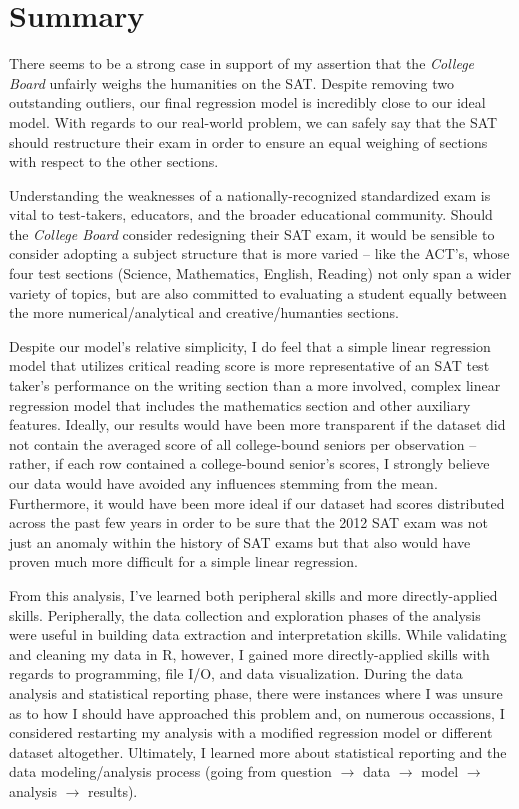 \documentclass[11pt]{article} %
\begin{document}
\section*{Summary}
There seems to be a strong case in support of my assertion that the \textit{College Board} unfairly weighs the humanities on the SAT. Despite removing two outstanding outliers, our final regression model is incredibly close to our ideal model. With regards to our real-world problem, we can safely say that the SAT should restructure their exam in order to ensure an equal weighing of sections with respect to the other sections. \par
Understanding the weaknesses of a nationally-recognized standardized exam is vital to test-takers, educators, and the broader educational community. Should the \textit{College Board} consider redesigning their SAT exam, it would be sensible to consider adopting a subject structure that is more varied -- like the ACT's, whose four test sections (Science, Mathematics, English, Reading) not only span a wider variety of topics, but are also committed to evaluating a student equally between the more numerical/analytical and creative/humanties sections. \par
Despite our model's relative simplicity, I do feel that a simple linear regression model that utilizes critical reading score is more representative of an SAT test taker's performance on the writing section than a more involved, complex linear regression model that includes the mathematics section and other auxiliary features. Ideally, our results would have been more transparent if the dataset did not contain the averaged score of all college-bound seniors per observation -- rather, if each row contained a college-bound senior's scores, I strongly believe our data would have avoided any influences stemming from the mean. Furthermore, it would have been more ideal if our dataset had scores distributed across the past few years in order to be sure that the 2012 SAT exam was not just an anomaly within the history of SAT exams but that also would have proven much more difficult for a simple linear regression. \par
From this analysis, I've learned both peripheral skills and more directly-applied skills. Peripherally, the data collection and exploration phases of the analysis were useful in building data extraction and interpretation skills. While validating and cleaning my data in \textsc{R}, however, I gained more directly-applied skills with regards to programming, file I/O, and data visualization. During the data analysis and statistical reporting phase, there were instances where I was unsure as to how I should have approached this problem and, on numerous occassions, I considered restarting my analysis with a modified regression model or different dataset altogether. Ultimately, I learned more about statistical reporting and the data modeling/analysis process (going from question $\rightarrow$ data $\rightarrow$ model $\rightarrow$ analysis $\rightarrow$ results).
\end{document}
